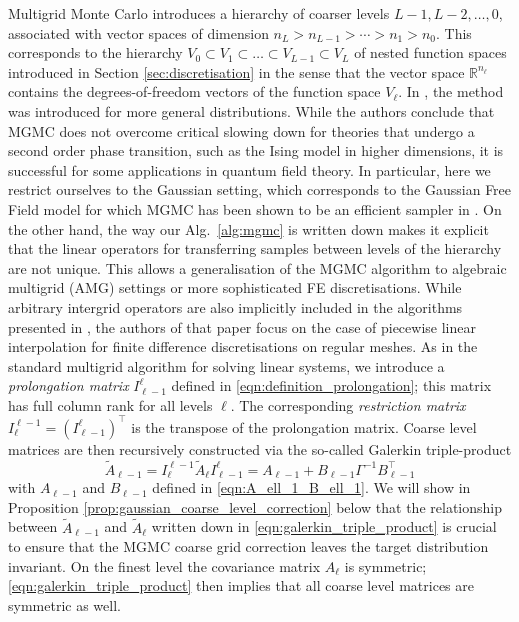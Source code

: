 \documentclass[11pt,english]{article}
\theoremstyle{plain}
\theoremstyle{plain}
\theoremstyle{plain}
\theoremstyle{plain}
\numberwithin{equation}{section}
\newcommand{\rev}[1]{#1}
\newcommand{\jg}[1]{#1}
\begin{document}
Multigrid Monte Carlo introduces a hierarchy of coarser levels $L-1,L-2,\dots,0$, associated with vector spaces of dimension $n_L > n_{L-1} > \dotsb > n_1 > n_0$. This corresponds to the hierarchy $V_0\subset V_1\subset \dots\subset V_{L-1}\subset V_L$ of nested function spaces introduced in Section \ref{sec:discretisation} in the sense that the vector space $\mathbb{R}^{n_{\ell}}$ contains the degrees-of-freedom vectors of the function space $V_\ell$. In \cite{goodman1989multigrid}, the method was introduced for more general distributions. \rev{While the authors conclude that MGMC does not overcome critical slowing down for theories that undergo a second order phase transition, such as the Ising model in higher dimensions,  it is successful for some applications in quantum field theory. In particular, here we restrict ourselves to the Gaussian setting, which corresponds to the Gaussian Free Field model for which MGMC has been shown to be an efficient sampler in \cite{goodman1989multigrid}.}
%
\jg{On the other hand, the way our Alg.~\ref{alg:mgmc} is written down makes it explicit that the linear operators for transferring samples between levels of the hierarchy are not unique. This allows a generalisation of the MGMC algorithm to algebraic multigrid (AMG) settings or more sophisticated FE discretisations. While arbitrary intergrid operators are also implicitly included in the algorithms presented in \cite{goodman1989multigrid}, the authors of that paper focus on the case of piecewise linear interpolation for finite difference discretisations on regular meshes. }%
As in the standard multigrid algorithm for solving linear systems, we introduce a \textit{prolongation matrix} $I_{\ell-1}^{\ell}$ defined in \eqref{eqn:definition_prolongation}; this matrix has full column rank for all levels $\ell$. The corresponding \textit{restriction matrix} $I_{\ell}^{\ell-1} = (I_{\ell-1}^{\ell})^\top$ is the transpose of the prolongation matrix.  Coarse level matrices are then recursively constructed via the so-called Galerkin triple-product
\begin{equation}
    \widetilde{A}_{\ell-1}  =I_{\ell}^{\ell-1} \widetilde{A}_\ell I_{\ell-1}^{\ell}                                                           = A_{\ell-1} + B_{\ell-1} \Gamma^{-1} B_{\ell-1}^{\top}
    \label{eqn:galerkin_triple_product}
\end{equation}
with $A_{\ell-1}$ and $B_{\ell-1}$ defined in \eqref{eqn:A_ell_1_B_ell_1}. We will show in Proposition \ref{prop:gaussian_coarse_level_correction} below that the relationship between $\widetilde{A}_{\ell-1}$ and $\widetilde{A}_{\ell}$ written down in \eqref{eqn:galerkin_triple_product} is crucial to ensure that the MGMC coarse grid correction leaves the target distribution invariant. On the finest level the covariance matrix $A_\ell$ is symmetric; \eqref{eqn:galerkin_triple_product} then implies that all coarse level matrices are symmetric as well.
\end{document}
